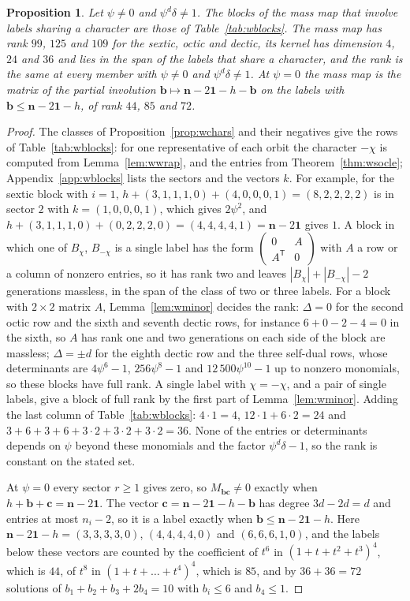 \documentclass[11pt]{amsart}
\newtheorem{proposition}[theorem]{Proposition}
\theoremstyle{definition}
\theoremstyle{remark}
\newcommand{\bb}{\mathbf{b}}
\newcommand{\cc}{\mathbf{c}}
\newcommand{\one}{\mathbf{1}}
\begin{document}
\begin{proposition}\label{prop:wmass}
Let $\psi\ne0$ and $\psi^d\delta\ne1$. The blocks of the mass map that
involve labels sharing a character are those of Table~\ref{tab:wblocks}.
The mass map has rank $99$, $125$ and $109$ for the sextic, octic and
dectic, its kernel has dimension $4$, $24$ and $36$ and lies in the span of
the labels that share a character, and the rank is the same at every member
with $\psi\ne0$ and $\psi^d\delta\ne1$. At $\psi=0$ the mass map is the
matrix of the partial involution $\bb\mapsto\mathbf n-2\one-h-\bb$ on the
labels with $\bb\le\mathbf n-2\one-h$, of rank $44$, $85$ and $72$.
\end{proposition}

\begin{proof}
The classes of Proposition~\ref{prop:wchars} and their negatives give the
rows of Table~\ref{tab:wblocks}: for one representative of each orbit the
character $-\chi$ is computed from Lemma~\ref{lem:wwrap}, and the entries
from Theorem~\ref{thm:wsocle}; Appendix~\ref{app:wblocks} lists the sectors
and the vectors $k$. For example, for the sextic block with $i=1$,
$h+(3,1,1,1,0)+(4,0,0,0,1)=(8,2,2,2,2)$ is in sector $2$ with
$k=(1,0,0,0,1)$, which gives $2\psi^2$, and $h+(3,1,1,1,0)+(0,2,2,2,0)=
(4,4,4,4,1)=\mathbf n-2\one$ gives $1$. A block in which one of $B_\chi$,
$B_{-\chi}$ is a single label has the form $\left(\begin{smallmatrix}0&A\\
A^{\mathsf T}&0\end{smallmatrix}\right)$ with $A$ a row or a column of
nonzero entries, so it has rank two and leaves $|B_\chi|+|B_{-\chi}|-2$
generations massless, in the span of the class of two or three labels. For
a block with $2\times2$ matrix $A$, Lemma~\ref{lem:wminor} decides the
rank: $\Delta=0$ for the second octic row and the sixth and seventh dectic
rows, for instance $6+0-2-4=0$ in the sixth, so $A$ has rank one and two
generations on each side of the block are massless; $\Delta=\pm d$ for the
eighth dectic row and the three self-dual rows, whose determinants are
$4\psi^6-1$, $256\psi^8-1$ and $12\,500\psi^{10}-1$ up to nonzero
monomials, so these blocks have full rank. A single label with
$\chi=-\chi$, and a pair of single labels, give a block of full rank by the
first part of Lemma~\ref{lem:wminor}. Adding the last column of
Table~\ref{tab:wblocks}: $4\cdot1=4$, $12\cdot1+6\cdot2=24$ and
$3+6+3+6+3\cdot2+3\cdot2+3\cdot2=36$. None of the entries or
determinants depends on $\psi$ beyond these monomials and the factor
$\psi^d\delta-1$, so the rank is constant on the stated set.

At $\psi=0$ every sector $r\ge1$ gives zero, so $M_{\bb\cc}\ne0$ exactly
when $h+\bb+\cc=\mathbf n-2\one$. The vector
$\cc=\mathbf n-2\one-h-\bb$ has degree $3d-2d=d$ and entries at most
$n_i-2$, so it is a label exactly when $\bb\le\mathbf n-2\one-h$. Here
$\mathbf n-2\one-h=(3,3,3,3,0)$, $(4,4,4,4,0)$ and $(6,6,6,1,0)$, and the
labels below these vectors are counted by the coefficient of $t^6$ in
$(1+t+t^2+t^3)^4$, which is $44$, of $t^8$ in $(1+t+\dots+t^4)^4$, which is
$85$, and by $36+36=72$ solutions of $b_1+b_2+b_3+2b_4=10$ with $b_i\le6$
and $b_4\le1$.
\end{proof}
\end{document}
